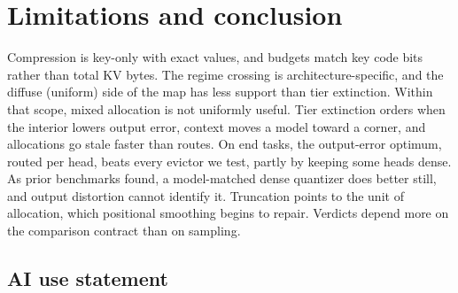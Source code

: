\documentclass{article}
\newif\ifshowest \showesttrue
\DeclareRobustCommand{\estonly}[1]{\ifshowest#1\else\ifhmode\unskip\fi\fi}
\theoremstyle{definition}
\begin{document}
\section{Limitations and conclusion}
\label{sec:conclusion}

Compression is key-only with exact values, and budgets match key code bits rather than total KV bytes. %
The regime crossing is architecture-specific, and the diffuse (uniform) side of the map has less support than tier extinction.
Within that scope, mixed allocation is not uniformly useful.  Tier extinction orders when the interior lowers output error, context moves a model toward a corner, and allocations go stale faster than routes.
On end tasks, the output-error optimum, routed per head, beats every evictor we test, partly by keeping some heads dense.  As prior benchmarks found, a model-matched dense quantizer does better still, and output distortion cannot identify it.
Truncation points to the unit of allocation, which positional smoothing begins to repair.  Verdicts depend more on the comparison contract than on sampling.

\label{main:end}

\subsection*{AI use statement}
\end{document}
